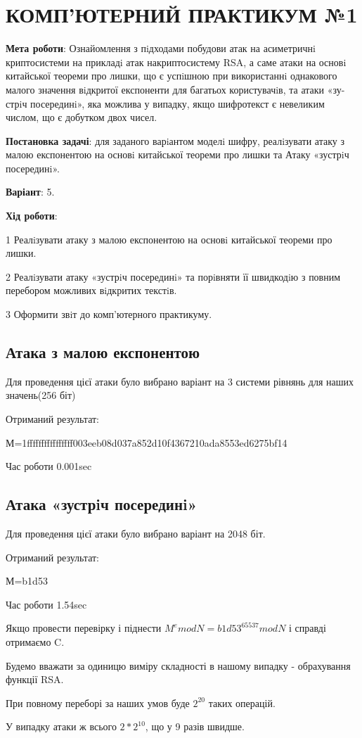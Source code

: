
\chapter{КОМП’ЮТЕРНИЙ ПРАКТИКУМ №1}

\textbf{Мета роботи}: Ознайомлення з пiдходами побудови атак на асиметричнi криптосистеми на прикладi атак накриптосистему RSA, а саме атаки на основi китайської теореми про лишки, що є успiшною при використаннi однакового малого значення вiдкритої експоненти для багатьох користувачiв, та атаки «зу-
стрiч посерединi», яка можлива у випадку, якщо шифротекст є невеликим числом, що є добутком двох
чисел.

\textbf{Постановка задачі}: для заданого варiантом моделi шифру,
реалiзувати атаку з малою експонентою на основi китайської теореми про лишки та Атаку «зустрiч посерединi».

\textbf{Варіант}: 5.

\textbf{Хід роботи}:

1 Реалiзувати атаку з малою експонентою на основi китайської теореми про лишки.

2 Реалiзувати атаку «зустрiч посерединi» та порiвняти її швидкодiю з повним перебором можливих
вiдкритих текстiв.

3 Оформити звiт до комп’ютерного практикуму.


\section{Атака з малою експонентою}

Для проведення цієї атаки було вибрано варіант на 3 системи рівнянь для наших значень(256 біт)

Отриманий результат:

М=1ffffffffffffffff003eeb08d037a852d10f4367210ada8553ed6275bf14

Час роботи 0.001sec


\section{Атака «зустрiч посерединi» }

Для проведення цієї атаки було вибрано варіант на 2048 біт.

Отриманий результат:

М=b1d53

Час роботи 1.54sec

Якщо провести перевірку і піднести $M^e modN=b1d53^{65537}mod N$ і справді отримаємо C.

Будемо вважати за одиницю виміру складності в нашому випадку - обрахування функції RSA.

При повному переборі за наших умов буде $2^20$ таких операцій. 

У випадку атаки ж всього $2*2^{10}$, що у 9 разів швидше.

